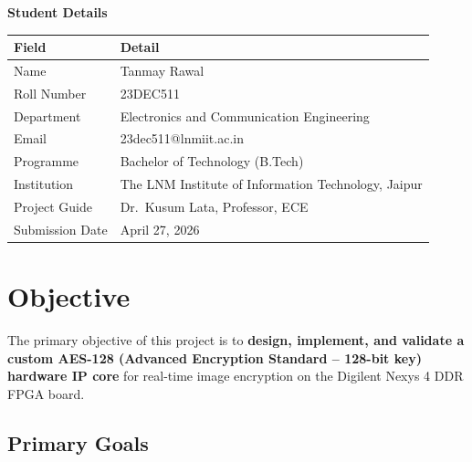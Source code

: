 \documentclass[12pt,a4paper]{article}
\begin{document}
\newpage
\thispagestyle{plain}
\vspace*{1cm}

{\large\bfseries\color{blue!70!black} Student Details}\\[0.5em]
\begin{tabular}{ll}
\toprule
\textbf{Field} & \textbf{Detail} \\
\midrule
Name            & Tanmay Rawal \\
Roll Number     & 23DEC511 \\
Department      & Electronics and Communication Engineering \\
Email           & 23dec511@lnmiit.ac.in \\
Programme       & Bachelor of Technology (B.Tech) \\
Institution     & The LNM Institute of Information Technology, Jaipur \\
Project Guide   & Dr.\ Kusum Lata, Professor, ECE \\
Submission Date & April 27, 2026 \\
\bottomrule
\end{tabular}

\vspace{2cm}

\newpage
\tableofcontents
\newpage
\listoffigures
\newpage

\section{Objective}

The primary objective of this project is to \textbf{design, implement, and validate a custom AES-128 (Advanced Encryption Standard -- 128-bit key) hardware IP core} for real-time image encryption on the Digilent Nexys 4 DDR FPGA board.

\subsection{Primary Goals}
\end{document}
